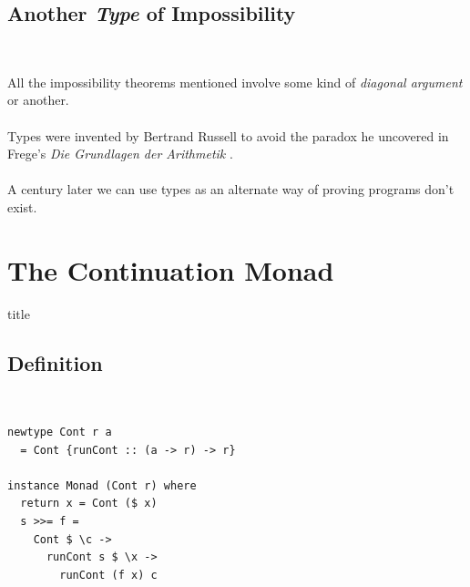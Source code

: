 \documentclass{beamer}
\begin{document}
\subsection{Another \emph{Type} of Impossibility}
\begin{frame}[plain]{\insertsectionhead\ \textemdash\
    \insertsubsectionhead}

  All the impossibility theorems mentioned involve some kind of \emph{diagonal argument} or another.\\~\\

  Types were invented by Bertrand Russell to avoid the paradox he
  uncovered in Frege's \emph{Die Grundlagen der Arithmetik} \cite{russelLetterFrege1981}. \\~\\

  A century later we can use types as an alternate way of proving
  programs don't exist.
\end{frame}

\section{The Continuation Monad}
\begin{frame}[plain]
  \vfill \centering
  \begin{beamercolorbox}[sep=8pt,center,shadow=true,rounded=true]{title}
    \usebeamerfont{title}\insertsectionhead\par%
  \end{beamercolorbox}
  \vfill
\end{frame}

\subsection{Definition}
\begin{frame}[fragile]{\insertsectionhead\ \textemdash\
    \insertsubsectionhead}
  \begin{lstlisting}
newtype Cont r a
  = Cont {runCont :: (a -> r) -> r}

instance Monad (Cont r) where
  return x = Cont ($ x)
  s >>= f =
    Cont $ \c ->
      runCont s $ \x ->
        runCont (f x) c
  \end{lstlisting}
\end{frame}
\end{document}
